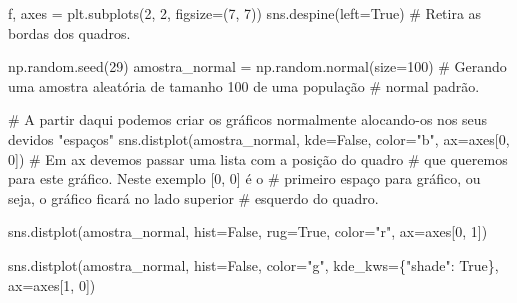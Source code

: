\documentclass[
  letterpaper,
  DIV=11,
  numbers=noendperiod]{scrreprt}
\newenvironment{Shaded}{\begin{snugshade}}{\end{snugshade}}
\newcommand{\CommentTok}[1]{\textcolor[rgb]{0.37,0.37,0.37}{#1}}
\newcommand{\DecValTok}[1]{\textcolor[rgb]{0.68,0.00,0.00}{#1}}
\newcommand{\NormalTok}[1]{\textcolor[rgb]{0.00,0.23,0.31}{#1}}
\newcommand{\OperatorTok}[1]{\textcolor[rgb]{0.37,0.37,0.37}{#1}}
\newcommand{\StringTok}[1]{\textcolor[rgb]{0.13,0.47,0.30}{#1}}
\newcommand{\VariableTok}[1]{\textcolor[rgb]{0.07,0.07,0.07}{#1}}
\begin{document}
\begin{Shaded}
\begin{Highlighting}[]

\NormalTok{f, axes }\OperatorTok{=}\NormalTok{ plt.subplots(}\DecValTok{2}\NormalTok{, }\DecValTok{2}\NormalTok{, figsize}\OperatorTok{=}\NormalTok{(}\DecValTok{7}\NormalTok{, }\DecValTok{7}\NormalTok{)) }
\NormalTok{sns.despine(left}\OperatorTok{=}\VariableTok{True}\NormalTok{)                               }\CommentTok{\# Retira as bordas dos quadros.}

\NormalTok{np.random.seed(}\DecValTok{29}\NormalTok{)}
\NormalTok{amostra\_normal }\OperatorTok{=}\NormalTok{ np.random.normal(size}\OperatorTok{=}\DecValTok{100}\NormalTok{)          }\CommentTok{\# Gerando uma amostra aleatória de tamanho 100 de uma população }
                                                     \CommentTok{\# normal padrão.}

\CommentTok{\# A partir daqui podemos criar os gráficos normalmente alocando{-}os nos seus devidos "espaços"}
\NormalTok{sns.distplot(amostra\_normal, }
\NormalTok{             kde}\OperatorTok{=}\VariableTok{False}\NormalTok{, }
\NormalTok{             color}\OperatorTok{=}\StringTok{"b"}\NormalTok{, }
\NormalTok{             ax}\OperatorTok{=}\NormalTok{axes[}\DecValTok{0}\NormalTok{, }\DecValTok{0}\NormalTok{])                          }\CommentTok{\# Em \textasciigrave{}ax\textasciigrave{} devemos passar uma lista com a posição do quadro}
                                                     \CommentTok{\# que queremos para este gráfico. Neste exemplo \textasciigrave{}[0, 0]\textasciigrave{} é o}
                                                     \CommentTok{\# primeiro espaço para gráfico, ou seja, o gráfico ficará no lado superior}
                                                     \CommentTok{\# esquerdo do quadro.}

\NormalTok{sns.distplot(amostra\_normal, }
\NormalTok{             hist}\OperatorTok{=}\VariableTok{False}\NormalTok{, }
\NormalTok{             rug}\OperatorTok{=}\VariableTok{True}\NormalTok{, }
\NormalTok{             color}\OperatorTok{=}\StringTok{"r"}\NormalTok{, }
\NormalTok{             ax}\OperatorTok{=}\NormalTok{axes[}\DecValTok{0}\NormalTok{, }\DecValTok{1}\NormalTok{])}

\NormalTok{sns.distplot(amostra\_normal, }
\NormalTok{             hist}\OperatorTok{=}\VariableTok{False}\NormalTok{, }
\NormalTok{             color}\OperatorTok{=}\StringTok{"g"}\NormalTok{, }
\NormalTok{             kde\_kws}\OperatorTok{=}\NormalTok{\{}\StringTok{"shade"}\NormalTok{: }\VariableTok{True}\NormalTok{\}, }
\NormalTok{             ax}\OperatorTok{=}\NormalTok{axes[}\DecValTok{1}\NormalTok{, }\DecValTok{0}\NormalTok{])}


\end{Highlighting}
\end{Shaded}
\end{document}
